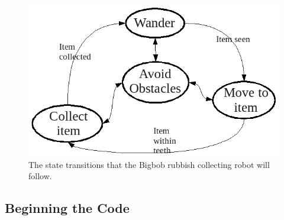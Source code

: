 \documentclass[a4paper]{report}
\begin{document}
\begin{figure}
	\centering
	\includegraphics[width=\linewidth]{./pics/coding/arch_structureOA.png}
	\caption{The state transitions that the Bigbob rubbish collecting robot will follow.}
	\label{fig:Coding:UsingProxiesExample:ControlArch:Structure}
\end{figure} 

\subsection{Beginning the Code}\label{sec:Coding:UsingProxiesExample:BeginningCode}
\end{document}

